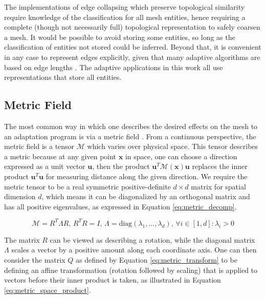 The implementations of edge collapsing which preserve
topological similarity require knowledge
of the classification for all mesh entities,
hence requiring a complete (though not necessarily full)
topological representation \cite{seol2006efficient}
to safely coarsen a mesh.
It would be possible to avoid storing some entities, so long
as the classification of entities not stored could be inferred.
Beyond that, it is convenient in any case to represent
edges explicitly, given that many adaptive algorithms
are based on edge lengths \cite{biswas1998tetrahedral}.
The adaptive applications in this work all use representations
that store all entities.

\subsection{Metric Field}
\label{sec:def_metric}

The most common way in which one describes the desired effects on
the mesh to an adaptation program is via a metric field
\cite{loseille2015parallel,compere2010mesh,li20053d}.
From a continuous perspective, the metric field is a tensor
$\mathcal{M}$ which varies over physical space.
This tensor describes a metric because at any given point
$\mathbf{x}$ in space, one can choose a direction expressed
as a unit vector $\mathbf{u}$, then the product
$\mathbf{u}^T\mathcal{M}(\mathbf{x})\mathbf{u}$ replaces the inner
product $\mathbf{u}^T\mathbf{u}$ for measuring distance along
the given direction.
We require the metric tensor to be a real symmetric positive-definite
$d\times d$ matrix for spatial dimension $d$, which means it
can be diagonalized by an orthogonal matrix and has all
positive eigenvalues, as expressed in Equation \ref{eq:metric_decomp}.

\begin{equation} \label{eq:metric_decomp}
\mathcal{M} = R^T\Lambda R,\, R^T R = I,\, \Lambda = \text{diag}(\lambda_1,\dots,\lambda_d),\,
\forall i\in [1,d]: \lambda_i > 0
\end{equation}

The matrix $R$ can be viewed as describing a rotation,
while the diagonal matrix $\Lambda$ scales a vector by a positive
amount along each coordinate axis.
One can then consider the matrix $Q$ as
defined by Equation \ref{eq:metric_transform} to be defining
an affine transformation (rotation followed by scaling) that
is applied to vectors before their inner product is taken,
as illustrated in Equation \ref{eq:metric_space_product}.

